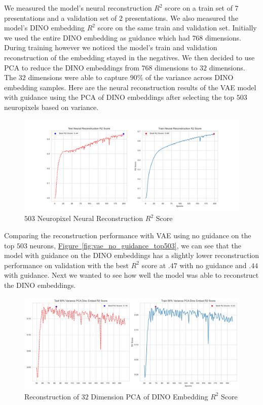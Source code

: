 \documentclass[12pt, letterpaper]{article}
\begin{document}
We measured the model's neural reconstruction $R^2$ score on a train set of $7$ presentations and a validation set of $2$ presentations. We also measured the model's DINO \cite{dino} embedding $R^2$ score on the same train and validation set. Initially we used the entire DINO \cite{dino} embedding as guidance which had $768$ dimensions. During training however we noticed the model's train and validation reconstruction of the embedding stayed in the negatives. We then decided to use PCA to reduce the DINO \cite{dino} embeddings from $768$ dimensions to $32$ dimensions. The $32$ dimensions were able to capture $90\%$ of the variance across DINO \cite{dino} embedding samples. Here are the neural reconstruction results of the VAE model with guidance using the PCA of DINO \cite{dino} embeddings after selecting the top $503$ neuropixels based on variance.

\begin{figure}[H]
    \centering
    \includegraphics[width=1.0\textwidth]{x_r2_128dim_503_top_var_200_epochs_0.05_beta_2_layer_.9_pca_DINO_embed.png}
    \caption{$503$ Neuropixel Neural Reconstruction $R^2$ Score}
    \label{fig:vae_guidance_DINO_pca}
\end{figure}

Comparing the reconstruction performance with VAE using no guidance on the top $503$ neurons, \hyperref[fig:vae_no_guidance_top503]{Figure~\ref{fig:vae_no_guidance_top503}}, we can see that the model with guidance on the DINO \cite{dino} embeddings has a slightly lower reconstruction performance on validation with the best $R^2$ score at $.47$ with no guidance and $.44$ with guidance. Next we wanted to see how well the model was able to reconstruct the DINO \cite{dino} embeddings.

\begin{figure}[H]
    \centering
    \includegraphics[width=.9\textwidth]{.9_pca_DINO_embed_r2_128dim_503_top_var_200_epochs_0.05_beta_2_layer.png}
    \caption{Reconstruction of $32$ Dimension PCA of DINO Embedding $R^2$ Score}
    \label{fig:vae_guidance_DINO_pca_DINO_embed_r2}
\end{figure}
\end{document}
